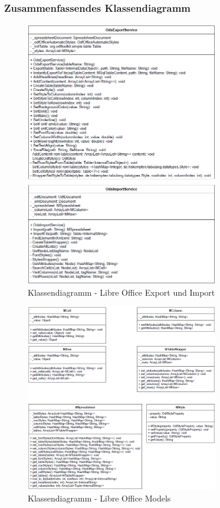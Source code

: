 \subsubsection{Zusammenfassendes Klassendiagramm}
\label{loClasses}
\begin{figure}[h]
\centering
\includegraphics[width=0.75\textwidth]{images/ods.png}
\caption{Klassendiagramm - Libre Office Export und Import}
\end{figure}
\newpage
\begin{figure}[h]
\centering
\includegraphics[width=0.75\textwidth]{images/ods-models.png}
\caption{Klassendiagramm - Libre Office Models}
\end{figure}